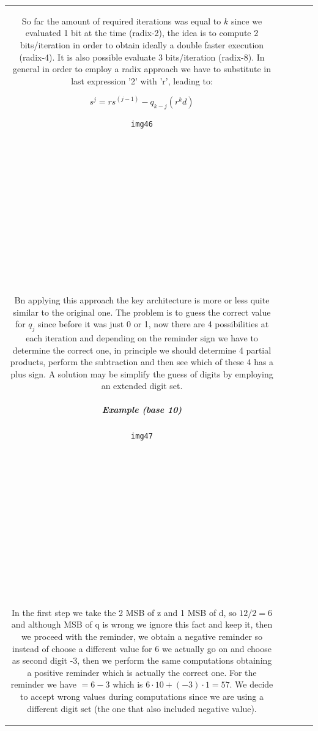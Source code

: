 \begin{center}
\begin{tabular}{|c|c|c|c|c|}
So far the amount of required iterations was equal to $k$ since we evaluated 1 bit at the time (radix-2), the idea is to compute 2 bits/iteration in order to obtain ideally a double faster execution (radix-4). It is also possible evaluate 3 bits/iteration (radix-8). In general in order to employ a radix approach we have to substitute in last expression '2' with 'r', leading to:

$$s^{j}=rs^{(j-1)}-q_{k-j} (r^k d)$$

\begin{verbatim}
img46














\end{verbatim}

Bn applying this approach the key architecture is more or less quite similar to the original one. The problem is to guess the correct value for $q_j$ since before it was just 0 or 1, now there are 4 possibilities at each iteration and depending on the reminder sign we have to determine the correct one, in principle we should determine 4 partial products, perform the subtraction and then see which of these 4 has a plus sign. A solution may be simplify the guess of digits by employing an extended digit set.

\subparagraph{Example (base 10)}

\begin{verbatim}
img47














\end{verbatim}
In the first step we take the 2 MSB of z and 1 MSB of d, so $12/2=6$ and although MSB of q is wrong we ignore this fact and keep it, then we proceed with the reminder, we obtain a negative reminder so instead of choose a different value for 6 we actually go on and choose as second digit -3, then we perform the same computations obtaining a positive reminder which is actually the correct one. For the reminder we have $= 6 -3$ which is $6 \cdot 10+(-3) \cdot 1=57$. We decide to accept wrong values during computations since we are using a different digit set (the one that also included negative value).


\end{tabular}
\end{center}
